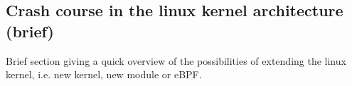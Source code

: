 \subsection{Crash course in the linux kernel architecture (brief)}
\label{subsec:crash_course_in_the_linux_kernel_architecture_(brief)}
Brief section giving a quick overview of the possibilities of extending the linux kernel, i.e. new kernel, new module or eBPF.
